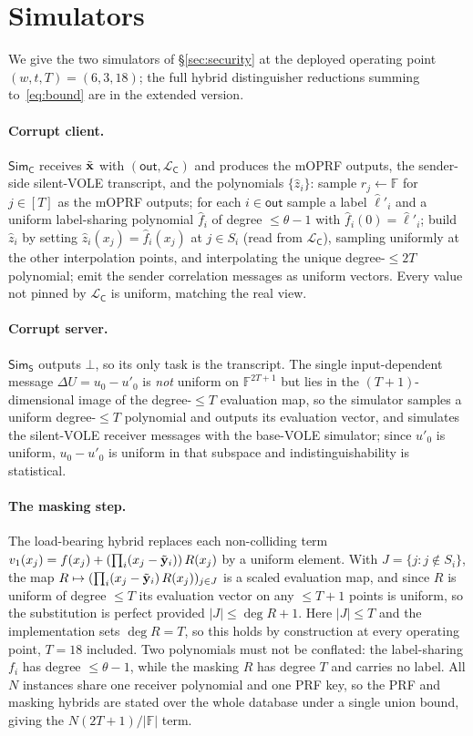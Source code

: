 \section{Simulators}
\label{app:hybrids}

We give the two simulators of \S\ref{sec:security} at the deployed operating point $(w,t,T)=(6,3,18)$;
the full hybrid distinguisher reductions summing to~\eqref{eq:bound} are in the extended version.

\paragraph{Corrupt client.} $\mathsf{Sim}_{\mathsf{C}}$ receives $\tilde{\mathbf{x}}$ with
$(\mathsf{out}, \mathcal{L}_{\mathsf{C}})$ and produces the mOPRF outputs, the sender-side silent-VOLE
transcript, and the polynomials $\{\hat z_i\}$: sample $r_j \leftarrow \mathbb{F}$ for $j \in [T]$ as
the mOPRF outputs; for each $i \in \mathsf{out}$ sample a label $\hat\ell'_i$ and a uniform
label-sharing polynomial $\hat f_i$ of degree $\le \theta-1$ with $\hat f_i(0)=\hat\ell'_i$; build
$\hat z_i$ by setting $\hat z_i(x_j)=\hat f_i(x_j)$ at $j \in S_i$ (read from
$\mathcal{L}_{\mathsf{C}}$), sampling uniformly at the other interpolation points, and interpolating
the unique degree-$\le 2T$ polynomial; emit the sender correlation messages as uniform vectors. Every
value not pinned by $\mathcal{L}_{\mathsf{C}}$ is uniform, matching the real view.

\paragraph{Corrupt server.} $\mathsf{Sim}_{\mathsf{S}}$ outputs $\bot$, so its only task is the
transcript. The single input-dependent message $\Delta U = u_0 - u'_0$ is \emph{not} uniform on
$\mathbb{F}^{2T+1}$ but lies in the $(T{+}1)$-dimensional image of the degree-$\le T$ evaluation map,
so the simulator samples a uniform degree-$\le T$ polynomial and outputs its evaluation vector, and
simulates the silent-VOLE receiver messages with the base-VOLE simulator; since $u'_0$ is uniform,
$u_0-u'_0$ is uniform in that subspace and indistinguishability is statistical.

\paragraph{The masking step.} The load-bearing hybrid replaces each non-colliding term
$v_1(x_j) = f(x_j) + (\prod_i (x_j - \tilde{\mathbf{y}}_i))\,R(x_j)$ by a uniform element. With $J = \{j : j \notin
S_i\}$, the map $R \mapsto (\prod_i(x_j-\tilde{\mathbf{y}}_i)\,R(x_j))_{j\in J}$ is a scaled evaluation map, and since
$R$ is uniform of degree $\le T$ its evaluation vector on any $\le T+1$ points is uniform, so the
substitution is perfect provided $|J| \le \deg R + 1$. Here $|J| \le T$ and the implementation sets
$\deg R = T$, so this holds by construction at every operating point, $T=18$ included. Two polynomials
must not be conflated: the label-sharing $f_i$ has degree $\le\theta-1$, while the masking $R$ has
degree $T$ and carries no label. All $N$ instances share one receiver polynomial and one PRF key, so
the PRF and masking hybrids are stated over the whole database under a single union bound, giving the
$N(2T+1)/|\mathbb{F}|$ term.
